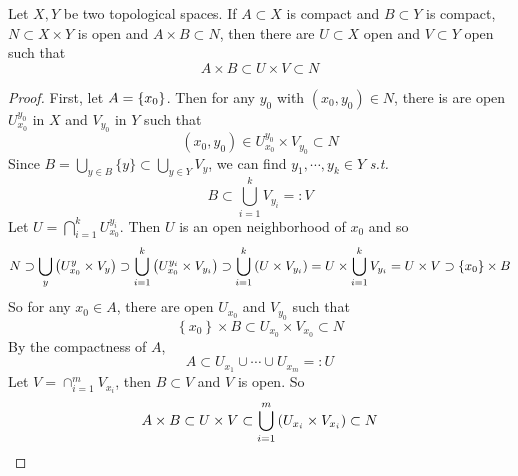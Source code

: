 \begin{enumerate}[label=\arabic{*}.]
	\begin{lem}
		Let $X,Y$ be two topological spaces. If $A \subset X$ is compact and $B \subset Y$ is compact, $N \subset X \times Y$ is open and $A \times B \subset N$, then there are $U \subset X$ open and $V \subset Y$ open such that
		\begin{equation*}
			A \times B \subset U \times V \subset N
		\end{equation*}
	\end{lem}
	\begin{proof}
		First, let $A=\left\{x_0\right\}$. Then for any $y_0$ with $(x_0,y_0) \in N$, there is are open $U_{x_0}^{y_0}$ in $X$ and $V_{y_0}$ in $Y$ such that
		\begin{equation*}
			\left(x_0, y_0\right) \in U_{x_0}^{y_0} \times V_{y_0} \subset N
		\end{equation*}
		Since $B=\bigcup_{y \in B}\{y\} \subset \bigcup_{y \in Y} V_y$, we can find $y_1, \cdots, y_k \in Y$ \emph{s.t.}
		\begin{equation*}
			B \subset \bigcup_{i=1}^k V_{y_i}=: V 
		\end{equation*}
		Let $U = \bigcap_{i=1}^k U_{x_0}^{y_i}$. Then $U$ is an open neighborhood of $x_0$ and so
		\begin{equation*}
			N \supset \bigcup_y\left(U_{x_0}^y \times V_y\right) \supset \bigcup_{i=1}^k\left(U_{x_0}^{y_i} \times V_{y_i}\right) \supset \bigcup_{i=1}^k\left(U \times V_{y_i}\right)=U \times \bigcup_{i=1}^k V_{y_i}=U \times V \supset \left\{x_0\right\} \times B
		\end{equation*}
		So for any $x_0 \in A$, there are open $U_{x_0}$ and $V_{y_0}$ such that
		\begin{equation*}
			\left\{x_0\right\} \times B \subset U_{x_0} \times V_{x_0} \subset N
		\end{equation*}
		By the compactness of $A$,
		\begin{equation*}
			A \subset U_{x_1} \cup \cdots \cup U_{x_m}=: U
		\end{equation*}
		Let $V=\cap_{i=1}^m V_{x_i}$, then $B \subset V$ and $V$ is open. So
		\begin{equation*}
			A \times B \subset U \times V \subset \bigcup_{i=1}^m\left(U_{x_i} \times V_{x_i}\right) \subset N \qedhere
		\end{equation*}
	\end{proof}


\end{enumerate}
